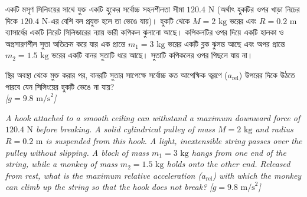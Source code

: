 \documentclass[12pt, a4paper]{article}
\begin{document}
\begin{tcolorbox}[questionbox={প্রশ্ন (Question) 4}]
\noindent
একটি মসৃণ সিলিংয়ের সাথে যুক্ত একটি হুকের সর্বোচ্চ সহনশীলতা সীমা $120.4\text{ N}$ (অর্থাৎ হুকটির ওপর খাড়া নিচের দিকে $120.4\text{ N}$-এর বেশি বল প্রযুক্ত হলে তা ভেঙে যায়)। হুকটি থেকে $M = 2\text{ kg}$ ভরের এবং $R = 0.2\text{ m}$ ব্যাসার্ধের একটি নিরেট সিলিন্ডারের ন্যায় ভারী কপিকল ঝুলানো আছে। কপিকলটির ওপর দিয়ে একটি হালকা ও অপ্রসারণশীল সুতা অতিক্রম করে যার এক প্রান্তে $m_1 = 3\text{ kg}$ ভরের একটি ব্লক ঝুলন্ত আছে এবং অপর প্রান্তে $m_2 = 1.5\text{ kg}$ ভরের একটি বানর সুতাটি ধরে আছে। সুতাটি কপিকলের ওপর পিছলে যায় না। 

\vspace{0.3em}
\noindent
স্থির অবস্থা থেকে মুক্ত করার পর, বানরটি সুতার সাপেক্ষে সর্বোচ্চ কত আপেক্ষিক ত্বরণে ($a_{\text{rel}}$) উপরের দিকে উঠতে পারবে যেন সিলিংয়ের হুকটি ভেঙে না যায়? \\
\textit{[$g = 9.8\text{ m/s}^2$]}

\vspace{0.8em}
\begin{english}
\noindent\textit{\color{darkgray}
A hook attached to a smooth ceiling can withstand a maximum downward force of $120.4\text{ N}$ before breaking. A solid cylindrical pulley of mass $M = 2\text{ kg}$ and radius $R = 0.2\text{ m}$ is suspended from this hook. A light, inextensible string passes over the pulley without slipping. A block of mass $m_1 = 3\text{ kg}$ hangs from one end of the string, while a monkey of mass $m_2 = 1.5\text{ kg}$ holds onto the other end. Released from rest, what is the maximum relative acceleration ($a_{\text{rel}}$) with which the monkey can climb up the string so that the hook does not break? [$g = 9.8\text{ m/s}^2$]
}
\end{english}
\end{tcolorbox}
\end{document}
